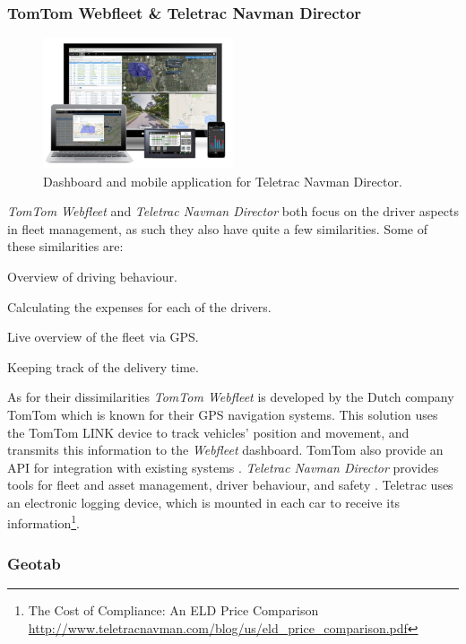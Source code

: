 \subsubsection{TomTom Webfleet \& Teletrac Navman Director}
\begin{figure}[h!]
    \centering
    \includegraphics[width=0.5\textwidth]{img/TELETRAC.jpg}
    \caption{Dashboard and mobile application for Teletrac Navman Director.}
    \label{fig:TELETRAC_NAVMAN_DIRECTOR}
\end{figure}
\textit{TomTom Webfleet} and \textit{Teletrac Navman Director} both focus on the driver aspects in fleet management, as such they also have quite a few similarities.
Some of these similarities are:
\begin{description}
    \item Overview of driving behaviour.
    \item Calculating the expenses for each of the drivers.
    \item Live overview of the fleet via GPS.
    \item Keeping track of the delivery time.
\end{description}
As for their dissimilarities \textit{TomTom Webfleet} is developed by the Dutch company TomTom which is known for their GPS navigation systems. This solution uses the TomTom LINK device to track vehicles' position and movement, and transmits this information to the \textit{Webfleet} dashboard. TomTom also provide an API for integration with existing systems \cite{tomtom}.
\textit{Teletrac Navman Director} provides tools for fleet and asset management, driver behaviour, and safety \cite{teletracnavman}.
Teletrac uses an electronic logging device, which is mounted in each car to receive its information\footnote{The Cost of Compliance: An ELD Price Comparison \url{http://www.teletracnavman.com/blog/us/eld_price_comparison.pdf}}.
\subsubsection{Geotab}

